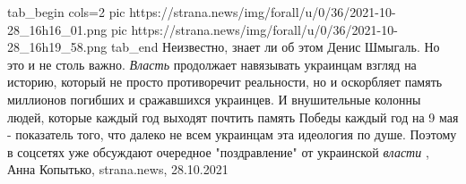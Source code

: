 \ifcmt
tab_begin cols=2
	pic https://strana.news/img/forall/u/0/36/2021-10-28_16h16_01.png
  pic https://strana.news/img/forall/u/0/36/2021-10-28_16h19_58.png
tab_end
\fi
Неизвестно, знает ли об этом Денис Шмыгаль. Но это и не столь важно.
\emph{Власть} продолжает навязывать украинцам взгляд на историю, который не
просто противоречит реальности, но и оскорбляет память миллионов погибших и
сражавшихся украинцев.  И внушительные колонны людей, которые каждый год
выходят почтить память Победы каждый год на 9 мая - показатель того, что далеко
не всем украинцам эта идеология по душе.  Поэтому в соцсетях уже обсуждают
очередное "поздравление" от украинской \emph{власти}
, 
Анна Копытько, strana.news, 28.10.2021
